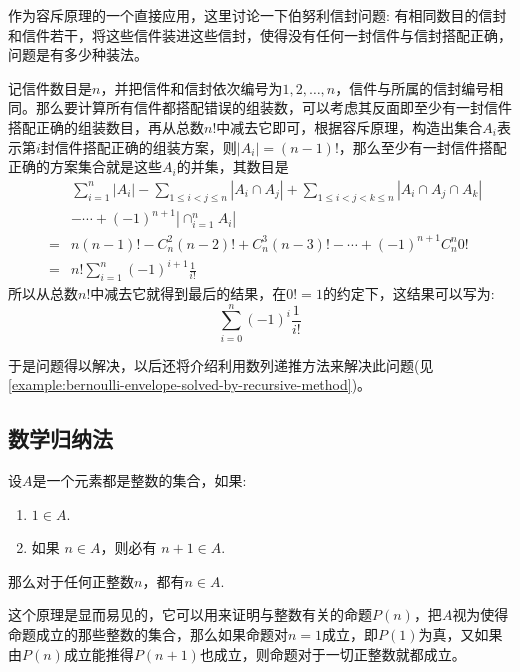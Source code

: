 \begin{example}
  \label{example:bernoulli-envelope-solved-by-inc-exclu-principle}
  作为容斥原理的一个直接应用，这里讨论一下伯努利信封问题: 有相同数目的信封和信件若干，将这些信件装进这些信封，使得没有任何一封信件与信封搭配正确，问题是有多少种装法。

  记信件数目是$n$，并把信件和信封依次编号为$1,2,\ldots,n$，信件与所属的信封编号相同。那么要计算所有信件都搭配错误的组装数，可以考虑其反面即至少有一封信件搭配正确的组装数目，再从总数$n!$中减去它即可，根据容斥原理，构造出集合$A_i$表示第$i$封信件搭配正确的组装方案，则$|A_i|=(n-1)!$，那么至少有一封信件搭配正确的方案集合就是这些$A_i$的并集，其数目是
  \begin{eqnarray*}
 &  &    \sum_{i=1}^n|A_i|-\sum_{1\leqslant i <j \leqslant n}|A_i \cap A_j|+\sum_{1 \leqslant i <j <k \leqslant n}|A_i\cap A_j \cap A_k| \\
  &    & -\cdots+(-1)^{n+1}|\cap_{i=1}^nA_i| \\
   &   = & n (n-1)! - C_n^2(n-2)! + C_n^3(n-3)! - \cdots + (-1)^{n+1}C_n^n0! \\
    &  = & n!\sum_{i=1}^n(-1)^{i+1}\frac{1}{i!}
  \end{eqnarray*}
  所以从总数$n!$中减去它就得到最后的结果，在$0!=1$的约定下，这结果可以写为:
  \begin{equation}
    \label{eq:bernoulli-envelope-problem-solution}
    \sum_{i=0}^n(-1)^i \frac{1}{i!}
  \end{equation}

  于是问题得以解决，以后还将介绍利用数列递推方法来解决此问题(见\autoref{example:bernoulli-envelope-solved-by-recursive-method})。
\end{example}

\subsection{数学归纳法}
\label{subsec:mathematical-induction}

\begin{principle}[第一数学归纳法]
  设$A$是一个元素都是整数的集合，如果:
  \begin{enumerate}
  \item $1 \in A$.
  \item 如果 $n \in A$，则必有 $ n+1 \in A$.
  \end{enumerate}
  那么对于任何正整数$n$，都有$n \in A$.
\end{principle}

这个原理是显而易见的，它可以用来证明与整数有关的命题$P(n)$，把$A$视为使得命题成立的那些整数的集合，那么如果命题对$n=1$成立，即$P(1)$为真，又如果由$P(n)$成立能推得$P(n+1)$也成立，则命题对于一切正整数就都成立。

